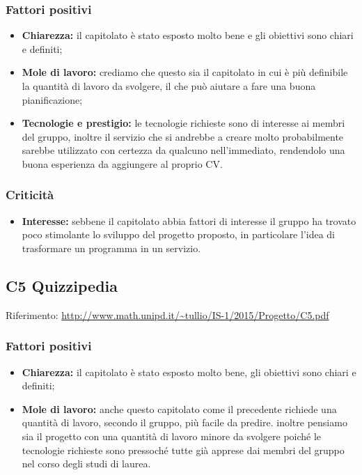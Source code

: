\documentclass{scalatekids-article}
\begin{document}
\subsubsection{Fattori positivi}
\begin{itemize}
\item \textbf{Chiarezza:} il capitolato è stato esposto molto bene e gli obiettivi sono chiari e definiti;
\item \textbf{Mole di lavoro:} crediamo che questo sia il capitolato in cui è più definibile la quantità di lavoro da svolgere, il che può aiutare a fare una buona pianificazione;
\item \textbf{Tecnologie e prestigio:} le tecnologie richieste sono di interesse ai membri del gruppo, inoltre il servizio che si andrebbe a creare molto probabilmente sarebbe utilizzato con certezza da qualcuno nell'immediato, rendendolo una buona esperienza da aggiungere al proprio CV.
\end{itemize}
\subsubsection{Criticità}
\begin{itemize}
\item \textbf{Interesse:} sebbene il capitolato abbia fattori di interesse il gruppo ha trovato poco stimolante lo sviluppo del progetto proposto, in particolare l'idea di trasformare un programma in un servizio.
\end{itemize}

\subsection{C5 Quizzipedia}
Riferimento: \url{http://www.math.unipd.it/~tullio/IS-1/2015/Progetto/C5.pdf}\\
\subsubsection{Fattori positivi}
\begin{itemize}
\item \textbf{Chiarezza:} il capitolato è stato esposto molto bene, gli obiettivi sono chiari e definiti;
\item \textbf{Mole di lavoro:} anche questo capitolato come il precedente richiede una quantità di lavoro, secondo il gruppo, più facile da predire. inoltre pensiamo sia il progetto con una quantità di lavoro minore da svolgere poiché le tecnologie richieste sono pressoché tutte già apprese dai membri del gruppo nel corso degli studi di laurea.
\end{itemize}
\end{document}
